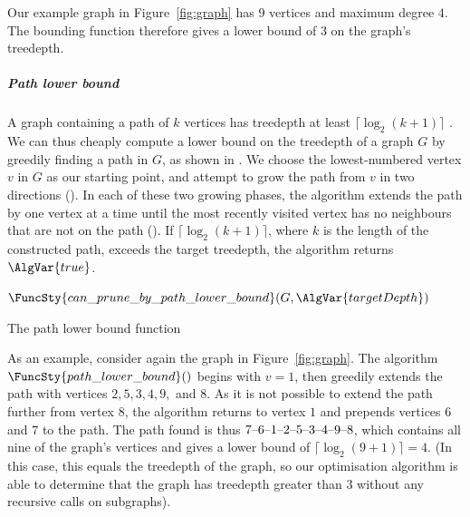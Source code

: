 {    Our example graph in Figure~\ref{fig:graph} has $9$ vertices and maximum degree $4$.
    The bounding function therefore gives a lower bound of 3 on the graph's treedepth.

    \subparagraph*{Path lower bound}

    A graph containing a path of $k$ vertices has treedepth at least
    $\lceil \log_2(k+1)\rceil$ \cite{DBLP:books/daglib/0030491}.  We can thus cheaply
    compute a lower bound on the treedepth of a graph $G$ by greedily
    finding a path in $G$, as shown in .
    We choose the lowest-numbered vertex $v$ in $G$ as our starting point, and
    attempt to grow the path from $v$ in two directions ().
    In each of these two growing phases, the algorithm extends the path
    by one vertex at a time until the most recently visited vertex has no
    neighbours that are not on the path ().
    If $\lceil \log_2(k+1)\rceil$, where $k$ is the length of the constructed path,
    exceeds the target treedepth, the algorithm returns $\AlgVar{true}$.

    {
    \begin{algorithm}[h!]
     \footnotesize
    \DontPrintSemicolon
    \newcommand\PathLowerBound{\FuncSty{can\_prune\_by\_path\_lower\_bound}}
    \nl $\PathLowerBound(G, \AlgVar{targetDepth})$ \label{path_lower_bound_fun} \;
    \nl {}
    \caption{The path lower bound function}
    \label{PathLowerBoundAlgorithm}
    \end{algorithm}
    }

    As an example, consider again the graph in Figure~\ref{fig:graph}.  The
    algorithm $\FuncSty{path\_lower\_bound}()$ begins with $v=1$, then greedily
    extends the path with vertices $2, 5, 3, 4, 9,$ and $8$.  As it is not
    possible to extend the path further from vertex $8$, the algorithm returns
    to vertex $1$ and prepends vertices $6$ and $7$ to the path.  The path found
    is thus $7\text{--} 6\text{--} 1\text{--} 2\text{--} 5\text{--} 3\text{--} 4\text{--} 9\text{--} 8$, which contains
    all nine of the graph's vertices and gives a lower bound of $\lceil \log_2(9+1)\rceil = 4$.
    (In this case, this equals the treedepth of the graph, so our optimisation algorithm is
    able to determine that the graph has treedepth greater than 3 without any recursive calls
    on subgraphs).

}
